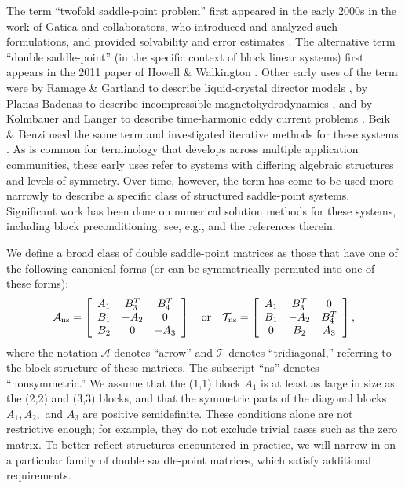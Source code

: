 \documentclass{article}
\newcommand{\sA}{\mathcal{A}}
\newcommand{\sT}{\mathcal{T}}
\begin{document}
The term ``twofold saddle-point problem'' first appeared in the early 2000s in the work of Gatica and collaborators, who introduced and analyzed such formulations, and provided solvability and error estimates \cite{BarrientosGaticaStephan2001,GaticaHeuer2002,GaticaHeuerMeddahi2003,GaticaMeddahi2000}. The alternative term  ``double saddle-point'' (in the specific context of block linear systems) first appears in the 2011 paper of Howell \& Walkington \cite{hw11}. Other early uses of the term were by Ramage \& Gartland to describe liquid-crystal director models \cite{GartlandRamage2015,rg13}, by Planas Badenas to describe incompressible magnetohydrodynamics \cite{p13}, and by Kolmbauer and Langer to describe time-harmonic eddy current problems \cite{kl13}. Beik \& Benzi used the same term and investigated iterative methods for these systems  \cite{BeikBenzi2018}. As is common for terminology that develops across multiple application communities, these early uses refer to systems with differing algebraic structures and levels of symmetry. Over time, however, the term has come to be used more narrowly to describe a specific class of structured saddle-point systems. Significant work has been done on numerical solution methods for these systems, including block preconditioning; see, e.g., \cite{BalaniHajarianBergamaschi2024,BergamaschiTriangular2025,BergamaschiEtAl2025,SognZulehner2017,SognZulehner2019} and the references therein. 
 

We define a broad class of double saddle-point matrices as those that have one of the following canonical forms (or can be symmetrically permuted into one of these forms):
\begin{equation}
\label{eq:2sp_arrow_ns}
   \sA_{\text{ns}} = \left[ \begin{array}{ccc}
    A_1 & B_3^T & B_4^T \\
    B_1 & -A_2 & 0 \\
    B_2 & 0 & -A_3
    \end{array} \right] 
\quad {\rm or} \quad
    \sT_{\text{ns}} = \left[ \begin{array}{ccc}
    A_1 & B_3^T & 0 \\
    B_1 & -A_2 & B_4^T \\
    0 & B_2 & A_3
    \end{array}\right],
\end{equation}
where the notation $\sA$ denotes ``arrow'' and $\sT$ denotes ``tridiagonal,'' referring to the block structure of these matrices.
The subscript ``ns'' denotes ``nonsymmetric.''  We assume that the (1,1) block $A_1$ is at least as large in size as the (2,2) and (3,3) blocks, and that the symmetric parts of the diagonal blocks $A_1, A_2,$ and $A_3$ are positive semidefinite.
These conditions alone are not restrictive enough; for example, they do not exclude trivial cases such as the zero matrix. To better reflect structures encountered in practice, we will narrow in on a particular family of double saddle-point matrices, which satisfy additional requirements.
\end{document}
